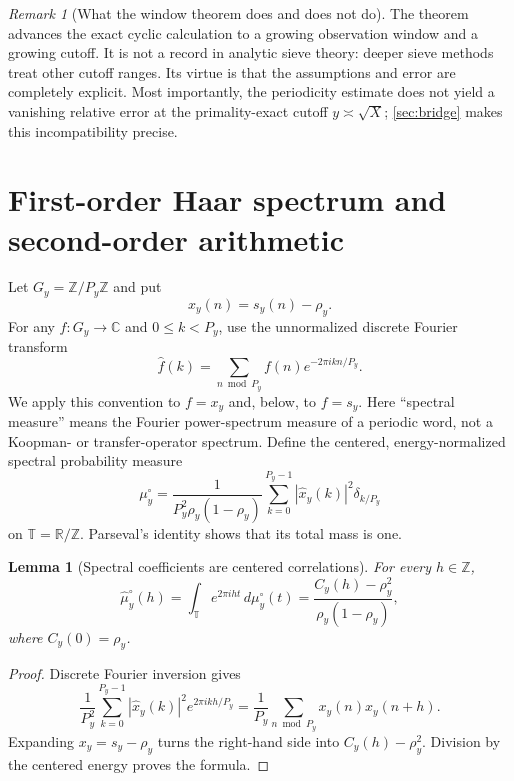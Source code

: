 \documentclass[11pt]{article}
\newtheorem{lemma}[theorem]{Lemma}
\theoremstyle{definition}
\theoremstyle{remark}
\newtheorem{remark}[theorem]{Remark}
\newcommand{\Z}{\mathbb Z}
\newcommand{\R}{\mathbb R}
\newcommand{\T}{\mathbb T}
\begin{document}
\begin{remark}[What the window theorem does and does not do]\label{rem:window-limit}
The theorem advances the exact cyclic calculation to a growing observation window and a growing cutoff.  It is not a record in analytic sieve theory: deeper sieve methods treat other cutoff ranges.  Its virtue is that the assumptions and error are completely explicit.  Most importantly, the periodicity estimate does not yield a vanishing relative error at the primality-exact cutoff $y\asymp\sqrt X$; \cref{sec:bridge} makes this incompatibility precise.
\end{remark}

\section{First-order Haar spectrum and second-order arithmetic}\label{sec:spectrum}

Let $G_y=\Z/P_y\Z$ and put
\begin{equation}\label{eq:centered-word}
    x_y(n)=s_y(n)-\rho_y.
\end{equation}
For any $f:G_y\to\mathbb C$ and $0\le k<P_y$, use the unnormalized discrete Fourier transform
\begin{equation}\label{eq:dft}
    \widehat f(k)=\sum_{n\bmod P_y}f(n)e^{-2\pi i kn/P_y}.
\end{equation}
We apply this convention to $f=x_y$ and, below, to $f=s_y$.  Here ``spectral measure'' means the Fourier power-spectrum measure of a periodic word, not a Koopman- or transfer-operator spectrum.
Define the centered, energy-normalized spectral probability measure
\begin{equation}\label{eq:centered-spectral-measure}
    \mu_y^\circ
    =\frac1{P_y^2\rho_y(1-\rho_y)}
      \sum_{k=0}^{P_y-1}|\widehat x_y(k)|^2\delta_{k/P_y}
\end{equation}
on $\T=\R/\Z$.  Parseval's identity shows that its total mass is one.

\begin{lemma}[Spectral coefficients are centered correlations]\label{lem:spectral-coefficients}
For every $h\in\Z$,
\begin{equation}\label{eq:spectral-coefficient}
    \widehat\mu_y^\circ(h)
    =\int_{\T}e^{2\pi iht}\,d\mu_y^\circ(t)
    =\frac{C_y(h)-\rho_y^2}{\rho_y(1-\rho_y)},
\end{equation}
where $C_y(0)=\rho_y$.
\end{lemma}

\begin{proof}
Discrete Fourier inversion gives
\[
 \frac1{P_y^2}\sum_{k=0}^{P_y-1}|\widehat x_y(k)|^2e^{2\pi ikh/P_y}
 =\frac1{P_y}\sum_{n\bmod P_y}x_y(n)x_y(n+h).
\]
Expanding $x_y=s_y-\rho_y$ turns the right-hand side into $C_y(h)-\rho_y^2$.  Division by the centered energy proves the formula.
\end{proof}
\end{document}
